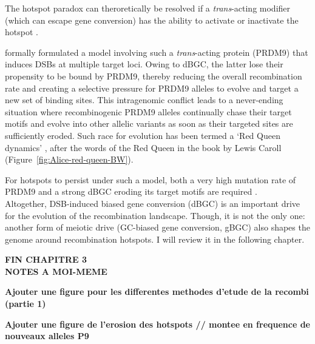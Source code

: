 The hotspot paradox can theroretically be resolved if a \textit{trans}-acting modifier (which can escape gene conversion) has the ability to activate or inactivate the hotspot \citep{peters2008combination,friberg2008cut}.

\citet{ubeda2011red} formally formulated a model involving such a \textit{trans}-acting protein (PRDM9) that induces DSBs at multiple target loci.
Owing to dBGC, the latter lose their propensity to be bound by PRDM9, thereby reducing the overall recombination rate and creating a selective pressure for PRDM9 alleles to evolve and target a new set of binding sites. 
This intragenomic conflict leads to a never-ending situation where recombinogenic PRDM9 alleles continually chase their target motifs and evolve into other allelic variants as soon as their targeted sites are sufficiently eroded.
Such race for evolution has been termed a ‘Red Queen dynamics’ \citep{vanvalen1973new}, after the words of the Red Queen in the \textit{} book by Lewis Caroll \citeyearpar{carroll1871lookingglass} (Figure~\ref{fig:Alice-red-queen-BW}).

For hotspots to persist under such a model, both a very high mutation rate of PRDM9 and a strong dBGC eroding its target motifs are required \citep{latrille2017red}.\\



Altogether, DSB-induced biased gene conversion (dBGC) is an important drive for the evolution of the recombination landscape.
Though, it is not the only one: another form of meiotic drive (GC-biased gene conversion, gBGC) also shapes the genome around recombination hotspots. 
I will review it in the following chapter.

\textbf{FIN CHAPITRE 3}\\



\textbf{NOTES A MOI-MEME} 

\textbf{Ajouter une figure pour les differentes methodes d'etude de la recombi (partie 1)}

\textbf{Ajouter une figure de l'erosion des hotspots // montee en frequence de nouveaux alleles P9}


